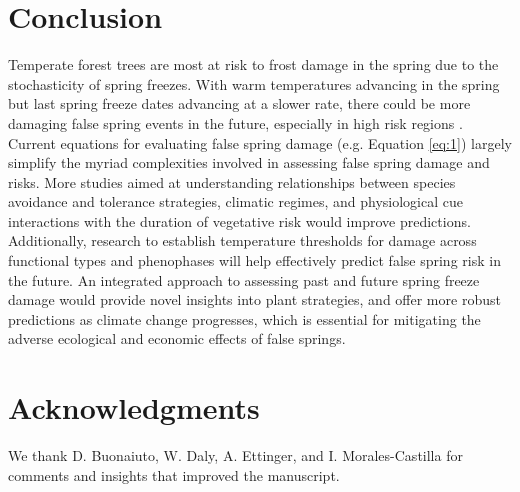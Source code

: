 \documentclass{article}\usepackage[]{graphicx}\usepackage[]{color}
\begin{document}
\section*{Conclusion}
Temperate forest trees are most at risk to frost damage in the spring due to the stochasticity of spring freezes. With warm temperatures advancing in the spring but last spring freeze dates advancing at a slower rate, there could be more damaging false spring events in the future, especially in high risk regions \citep{Gu2008, Inouye2008, Liu2018}. Current equations for evaluating false spring damage (e.g. Equation \ref{eq:1}) largely simplify the myriad complexities involved in assessing false spring damage and risks. More studies aimed at understanding relationships between species avoidance and tolerance strategies, climatic regimes, and physiological cue interactions with the duration of vegetative risk would improve predictions. Additionally, research to establish temperature thresholds for damage across functional types and phenophases will help effectively predict false spring risk in the future. An integrated approach to assessing past and future spring freeze damage would provide novel insights into plant strategies, and offer more robust predictions as climate change progresses, which is essential for mitigating the adverse ecological and economic effects of false springs.

\section*{Acknowledgments}
We thank D. Buonaiuto,  W. Daly, A. Ettinger, and I. Morales-Castilla for comments and insights that improved the manuscript. 

\nocite{Soudani2012}
\nocite{White2009}
\nocite{Schaber2005}
\nocite{Schwartz1993}
\nocite{Barker2005}
\nocite{Sanchez2013}
\nocite{Longstroth2012}
\nocite{Barlow2015}
\nocite{Longstroth2013}
\nocite{Charrier2011}

\end{document}
